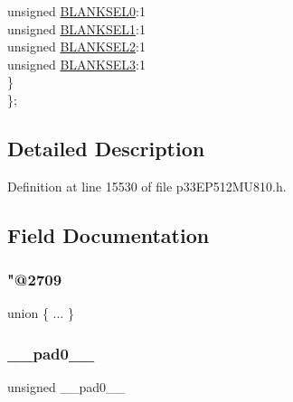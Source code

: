 \begin{DoxyCompactItemize}
\begin{tabbing}
\>\>unsigned \hyperlink{structtag_a_u_x_c_o_n6_b_i_t_s_ac11d96c4da7a19f8070237598aad5779}{BLANKSEL0}:1\\
\>\>unsigned \hyperlink{structtag_a_u_x_c_o_n6_b_i_t_s_a44677be7697055968c0df4a017937ad4}{BLANKSEL1}:1\\
\>\>unsigned \hyperlink{structtag_a_u_x_c_o_n6_b_i_t_s_aded93be63f6e5d719aa8cd84f125f650}{BLANKSEL2}:1\\
\>\>unsigned \hyperlink{structtag_a_u_x_c_o_n6_b_i_t_s_a9a435fdd957a6f0e1b6e67ea964df687}{BLANKSEL3}:1\\
\>\} \\
\}; \\

\end{tabbing}\end{DoxyCompactItemize}


\subsection{Detailed Description}


Definition at line 15530 of file p33\+E\+P512\+M\+U810.\+h.



\subsection{Field Documentation}
\mbox{\label{structtag_a_u_x_c_o_n6_b_i_t_s_ac6fe5b822e65c8fe68c2551848fc184a}} 
\subsubsection{\texorpdfstring{"@2709}{@2709}}
{\footnotesize\ttfamily union \{ ... \} }

\mbox{\label{structtag_a_u_x_c_o_n6_b_i_t_s_adf71f3d8410c1f1dbbc96680a92c49af}} 
\subsubsection{\texorpdfstring{\+\_\+\+\_\+pad0\+\_\+\+\_\+}{\_\_pad0\_\_}}
{\footnotesize\ttfamily unsigned \+\_\+\+\_\+pad0\+\_\+\+\_\+}



